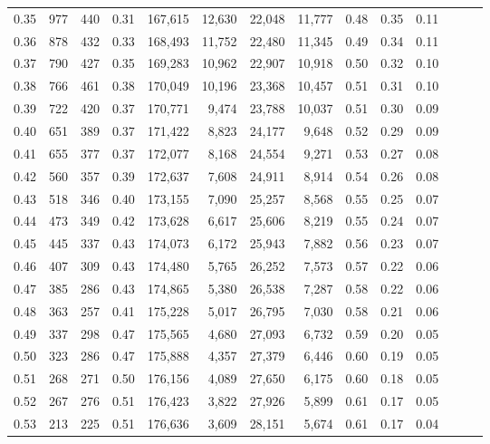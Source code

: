 \begin{tabular}{rrrrrrrrrrrrrr}
0.35 &     977 &  440 &  0.31 &  167,615 &   12,630 &  22,048 &  11,777 &  0.48 &  0.35 &      0.11 \\
0.36 &     878 &  432 &  0.33 &  168,493 &   11,752 &  22,480 &  11,345 &  0.49 &  0.34 &      0.11 \\
0.37 &     790 &  427 &  0.35 &  169,283 &   10,962 &  22,907 &  10,918 &  0.50 &  0.32 &      0.10 \\
0.38 &     766 &  461 &  0.38 &  170,049 &   10,196 &  23,368 &  10,457 &  0.51 &  0.31 &      0.10 \\
0.39 &     722 &  420 &  0.37 &  170,771 &    9,474 &  23,788 &  10,037 &  0.51 &  0.30 &      0.09 \\
0.40 &     651 &  389 &  0.37 &  171,422 &    8,823 &  24,177 &   9,648 &  0.52 &  0.29 &      0.09 \\
0.41 &     655 &  377 &  0.37 &  172,077 &    8,168 &  24,554 &   9,271 &  0.53 &  0.27 &      0.08 \\
0.42 &     560 &  357 &  0.39 &  172,637 &    7,608 &  24,911 &   8,914 &  0.54 &  0.26 &      0.08 \\
0.43 &     518 &  346 &  0.40 &  173,155 &    7,090 &  25,257 &   8,568 &  0.55 &  0.25 &      0.07 \\
0.44 &     473 &  349 &  0.42 &  173,628 &    6,617 &  25,606 &   8,219 &  0.55 &  0.24 &      0.07 \\
0.45 &     445 &  337 &  0.43 &  174,073 &    6,172 &  25,943 &   7,882 &  0.56 &  0.23 &      0.07 \\
0.46 &     407 &  309 &  0.43 &  174,480 &    5,765 &  26,252 &   7,573 &  0.57 &  0.22 &      0.06 \\
0.47 &     385 &  286 &  0.43 &  174,865 &    5,380 &  26,538 &   7,287 &  0.58 &  0.22 &      0.06 \\
0.48 &     363 &  257 &  0.41 &  175,228 &    5,017 &  26,795 &   7,030 &  0.58 &  0.21 &      0.06 \\
0.49 &     337 &  298 &  0.47 &  175,565 &    4,680 &  27,093 &   6,732 &  0.59 &  0.20 &      0.05 \\
0.50 &     323 &  286 &  0.47 &  175,888 &    4,357 &  27,379 &   6,446 &  0.60 &  0.19 &      0.05 \\
0.51 &     268 &  271 &  0.50 &  176,156 &    4,089 &  27,650 &   6,175 &  0.60 &  0.18 &      0.05 \\
0.52 &     267 &  276 &  0.51 &  176,423 &    3,822 &  27,926 &   5,899 &  0.61 &  0.17 &      0.05 \\
0.53 &     213 &  225 &  0.51 &  176,636 &    3,609 &  28,151 &   5,674 &  0.61 &  0.17 &      0.04 \\

\end{tabular}
